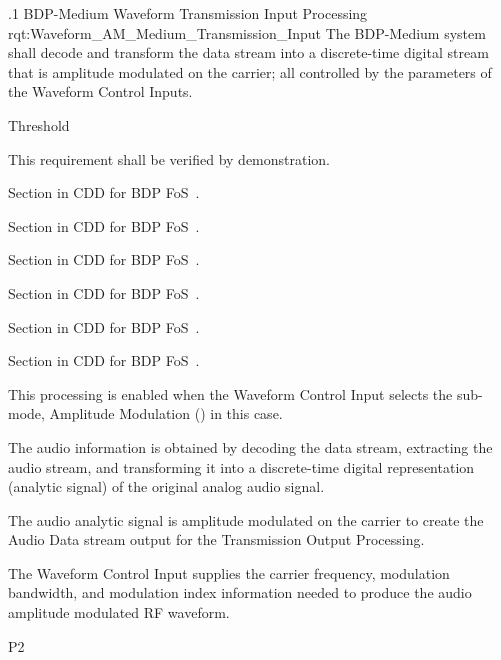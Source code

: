 \ONERQMTVKPP
{\RqtNumberBase.1}
{BDP-Medium \AM Waveform Transmission Input Processing}
{rqt:Waveform_AM_Medium_Transmission_Input}
{The BDP-Medium system shall decode and transform the \MPEGTS data stream into a discrete-time digital stream that is amplitude modulated on the \RF carrier; all controlled by the parameters of the Waveform Control Inputs.}
{
	\item [Phase 1]  Threshold
}
{This requirement shall be verified by demonstration.}
{
	\item [5.1.1] Section in CDD for BDP FoS~\cite{ref__BDP_FOS_CDD}.
	\item [5.1.2] Section in CDD for BDP FoS~\cite{ref__BDP_FOS_CDD}.
	\item [5.5.1] Section in CDD for BDP FoS~\cite{ref__BDP_FOS_CDD}.
	\item [5.5.2] Section in CDD for BDP FoS~\cite{ref__BDP_FOS_CDD}.
	\item [5.5.3] Section in CDD for BDP FoS~\cite{ref__BDP_FOS_CDD}.
	\item [5.5.4] Section in CDD for BDP FoS~\cite{ref__BDP_FOS_CDD}.
}
{
	\item This processing is enabled when the Waveform Control Input selects the sub-mode, Amplitude Modulation (\AM) in this case.
	\item The audio information is obtained by decoding the \MPEGTS data stream, extracting the audio stream, and transforming it into a discrete-time digital representation (analytic signal) of the original analog audio signal.
	\item The audio analytic signal is amplitude modulated on the \RF carrier to create the Audio Data stream output for the Transmission Output Processing.
	\item The Waveform Control Input supplies the \RF carrier frequency, modulation bandwidth, and modulation index information needed to produce the audio amplitude modulated RF waveform.
}
{P2}


